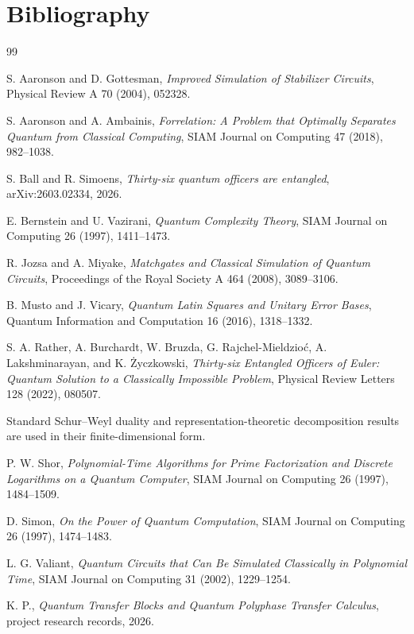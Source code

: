 \chapter*{Bibliography}
\begin{thebibliography}{99}

S. Aaronson and D. Gottesman,
\emph{Improved Simulation of Stabilizer Circuits},
Physical Review A 70 (2004), 052328.

S. Aaronson and A. Ambainis,
\emph{Forrelation: A Problem that Optimally Separates Quantum from Classical Computing},
SIAM Journal on Computing 47 (2018), 982--1038.

S. Ball and R. Simoens,
\emph{Thirty-six quantum officers are entangled},
arXiv:2603.02334, 2026.

E. Bernstein and U. Vazirani,
\emph{Quantum Complexity Theory},
SIAM Journal on Computing 26 (1997), 1411--1473.

R. Jozsa and A. Miyake,
\emph{Matchgates and Classical Simulation of Quantum Circuits},
Proceedings of the Royal Society A 464 (2008), 3089--3106.

B. Musto and J. Vicary,
\emph{Quantum Latin Squares and Unitary Error Bases},
Quantum Information and Computation 16 (2016), 1318--1332.

S. A. Rather, A. Burchardt, W. Bruzda, G. Rajchel-Mieldzio\'c, A. Lakshminarayan, and K. \.{Z}yczkowski,
\emph{Thirty-six Entangled Officers of Euler: Quantum Solution to a Classically Impossible Problem},
Physical Review Letters 128 (2022), 080507.

Standard Schur--Weyl duality and representation-theoretic decomposition results are used in their finite-dimensional form.

P. W. Shor,
\emph{Polynomial-Time Algorithms for Prime Factorization and Discrete Logarithms on a Quantum Computer},
SIAM Journal on Computing 26 (1997), 1484--1509.

D. Simon,
\emph{On the Power of Quantum Computation},
SIAM Journal on Computing 26 (1997), 1474--1483.

L. G. Valiant,
\emph{Quantum Circuits that Can Be Simulated Classically in Polynomial Time},
SIAM Journal on Computing 31 (2002), 1229--1254.

K. P.,
\emph{Quantum Transfer Blocks and Quantum Polyphase Transfer Calculus},
project research records, 2026.

\end{thebibliography}
